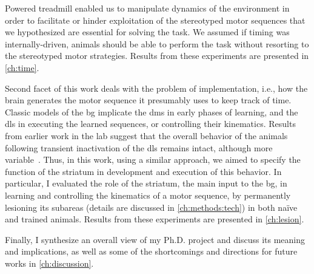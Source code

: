 Powered treadmill enabled us to manipulate dynamics of the environment in order to facilitate or hinder exploitation of the stereotyped motor sequences that we hypothesized are essential for solving the task.
We assumed if timing was internally-driven, animals should be able to perform the task without resorting to the stereotyped motor strategies.
Results from these experiments are presented in \autoref{ch:time}.
\par
Second facet of this work deals with the problem of implementation, i.e., how the brain generates the motor 
sequence it presumably uses to keep track of time.
Classic models of the \gls{bg} implicate the \gls{dms} in early phases of learning, and the \gls{dls} in executing the learned sequences, or controlling their kinematics.
Results from earlier work in the lab suggest that the overall behavior of the animals following transient inactivation of the \gls{dls} remains intact, although more variable~\cite{Rueda2015NN}.
Thus, in this work, using a similar approach, we aimed to specify the function of the striatum in development and execution of this behavior.
In particular, I evaluated the role of the striatum, the main input to the \gls{bg}, in learning and controlling the kinematics of a motor sequence, by permanently lesioning its subareas (details are discussed in \autoref{ch:methods:tech}) in both na\"ive and trained animals.
Results from these experiments are presented in \autoref{ch:lesion}.
\par
Finally, I synthesize an overall view of my Ph.D. project and discuss its meaning and implications, as well as some of the shortcomings and directions for future works in \autoref{ch:discussion}.